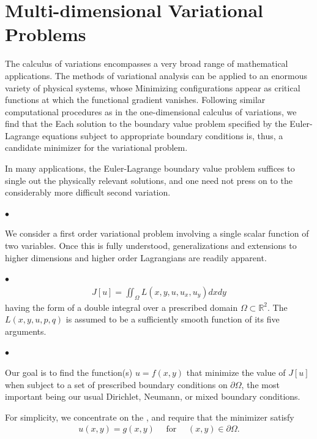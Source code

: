 \documentclass{article}
\begin{document}
\section{Multi-dimensional Variational Problems}
The calculus of variations encompasses a very broad range of mathematical applications. The methods of variational analysis can be applied to an enormous variety of physical systems, whose  Minimizing configurations appear as critical functions at which the functional gradient vanishes. Following similar computational procedures as in the one-dimensional calculus of variations, we find that the  Each solution to the boundary value problem specified by the Euler-Lagrange equations subject to appropriate boundary conditions is, thus, a candidate minimizer for the variational problem. 
\begin{rema}
In many applications, the Euler-Lagrange boundary value problem suffices to single out the physically relevant solutions, and one need not press on to the considerably more difficult second variation.
\end{rema}
$\bullet$ 

We consider a first order variational problem involving a single scalar function of two variables. Once this is fully understood, generalizations and extensions to higher dimensions and higher order Lagrangians are readily apparent.

$\bullet$ 
\begin{align*}
J[u]=\iint_{\Omega} L\left(x, y, u, u_{x}, u_{y}\right) d x d y
\end{align*}
having the form of a double integral over a prescribed domain $\Omega \subset \mathbb{R}^{2}$. The  $L(x, y, u, p, q)$ is assumed to be a sufficiently smooth function of its five arguments. 

$\bullet$ 

Our goal is to find the function(s) $u=f(x, y)$ that minimize the value of $J[u]$ when subject to a set of prescribed boundary conditions on $\partial \Omega$, the most important being our usual Dirichlet, Neumann, or mixed boundary conditions. 

For simplicity, we concentrate on the , and require that the minimizer satisfy
\begin{align*}
u(x, y)=g(x, y) \quad \text { for } \quad(x, y) \in \partial \Omega .
\end{align*}
\end{document}
